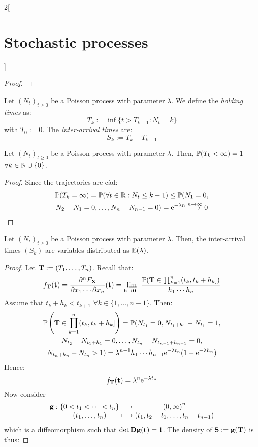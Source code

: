 \documentclass[../../../main_math.tex]{subfiles}
\begin{document}
\begin{multicols}{2}[\section{Stochastic processes}]
\begin{proof}
  \end{proof}
  \begin{definition}
    Let ${(N_t)}_{t\geq 0}$ be a Poisson process with parameter $\lambda$. We define the \emph{holding times} as:
    $$
      T_k:=\inf\{t> T_{k-1}:N_t=k\}
    $$
    with $T_0:=0$. The \emph{inter-arrival times} are:
    $$
      S_k:=T_k-T_{k-1}
    $$
  \end{definition}
  \begin{lemma}
    Let ${(N_t)}_{t\geq 0}$ be a Poisson process with parameter $\lambda$. Then, $\mathbb{P}(T_k < \infty)=1$ $\forall k\in\mathbb{N}\cup\{0\}$.
  \end{lemma}
  \begin{proof}
    Since the trajectories are càd:
    \begin{multline*}
      \mathbb{P}(T_k=\infty)=\mathbb{P}(\forall t\in\mathbb{R}: N_t\leq k-1)\leq \mathbb{P}(N_1=0,\\N_2-N_1 =0,\ldots,N_n-N_{n-1}=0)=\mathrm{e}^{-\lambda n} \overset{n\to\infty}{\longrightarrow}0
    \end{multline*}
  \end{proof}
  \begin{theorem}
    Let ${(N_t)}_{t\geq 0}$ be a Poisson process with parameter $\lambda$. Then, the inter-arrival times $(S_k)$ are \iid variables distributed as $\mathbb{E}(\lambda)$.
  \end{theorem}
  \begin{proof}
    Let $\boldsymbol{\mathrm{T}}:=(T_1,\ldots,T_n)$. Recall that:
    $$
      f_{\boldsymbol{\mathrm{T}}}(\boldsymbol{\mathrm{t}})=\frac{\partial^nF_{\boldsymbol{\mathrm{X}}}}{\partial x_1\cdots\partial x_n}(\boldsymbol{\mathrm{t}})=\lim_{\boldsymbol{\mathrm{h}}\to \boldsymbol{\mathrm{0}}^+}\frac{\mathbb{P}(\boldsymbol{\mathrm{T}}\in \prod_{k=1}^n(t_k,t_k+h_k])}{h_1\cdots h_n}
    $$
    Assume that $t_k+h_k<t_{k+1}$ $\forall k\in\{1,\ldots,n-1\}$. Then:
    \begin{multline*}
      \mathbb{P}\left(\boldsymbol{\mathrm{T}}\in \prod_{k=1}^n(t_k,t_k+h_k]\right)=\mathbb{P}(N_{t_1}=0, N_{t_1+h_1}-N_{t_1}=1, \\ N_{t_2}-N_{t_1+h_1}=0,\ldots,N_{t_{n}}-N_{t_{n-1}+h_{n-1}}=0,\\N_{t_n+h_n}-N_{t_n}>1)=\lambda^{n-1}h_1\cdots h_{n-1}\mathrm{e}^{-\lambda t_n}(1-\mathrm{e}^{-\lambda h_n})
    \end{multline*}
    Hence:
    $$
      f_{\boldsymbol{\mathrm{T}}}(\boldsymbol{\mathrm{t}})=\lambda^{n}\mathrm{e}^{-\lambda t_n}
    $$
    Now consider
    $$
      \function{\vf{g}}{\{0<t_1<\cdots<t_n\}}{{(0,\infty)}^n}{(t_1,\ldots,t_n)}{(t_1,t_2-t_1,\ldots,t_n-t_{n-1})}
    $$
    which is a diffeomorphism such that $\det \boldsymbol{\mathrm{Dg}}(\boldsymbol{\mathrm{t}})=1$. The density of $\boldsymbol{\mathrm{S}}:=\boldsymbol{\mathrm{g}}(\boldsymbol{\mathrm{T}})$ is thus:

\end{proof}
\end{multicols}
\end{document}
